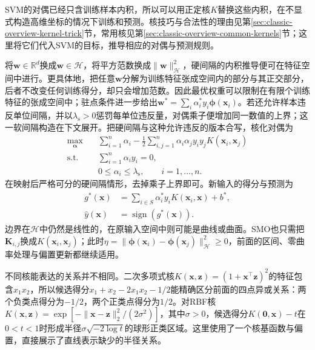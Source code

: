 SVM的对偶已经只含训练样本内积，所以可以用正定核$K$替换这些内积，在不显式构造高维坐标的情况下训练和预测。核技巧与合法性的理由见第\ref{sec:classic-overview-kernel-trick}节，常用核见第\ref{sec:classic-overview-common-kernels}节；这里将它们代入SVM的目标，推导相应的对偶与预测规则。

将$\bm{w}\in\mathbb{R}^d$换成$\bm{w}\in\mathcal{H}$，将平方范数换成$\lVert\bm{w}\rVert_{\mathcal{H}}^2$，硬间隔的内积推导便可在特征空间中进行。更具体地，把任意$\bm{w}$分解为训练特征张成空间内的部分与其正交部分，后者不改变任何训练得分，却只会增加范数。因此最优权重可以限制在有限个训练特征的张成空间中；驻点条件进一步给出$\bm{w}^{\ast}=\sum_i\alpha_i^{\ast}y_i\bm{\phi}(\bm{x}_i)$。若还允许样本违反单位间隔，并以$\lambda_{\mathrm s}>0$惩罚每单位违反量，对偶乘子便增加同一数值的上界；这一软间隔构造在下文展开。把硬间隔与这种允许违反的版本合写，核化对偶为
\begin{equation}
  \begin{aligned}
    \max_{\bm{\alpha}}\quad&
      \sum_{i=1}^n\alpha_i
       -\frac12\sum_{i,j=1}^n
          \alpha_i\alpha_j y_i y_j
          K(\bm{x}_i,\bm{x}_j)\\
    \text{s.t.}\quad&
      \sum_{i=1}^n\alpha_i y_i=0,\\
    &0\le\alpha_i\le\lambda_{\mathrm{s}},
      \qquad i=1,\ldots,n.
  \end{aligned}
  \label{eq:classification-svm-kernel-dual}
\end{equation}
在映射后严格可分的硬间隔情形，去掉乘子上界即可。新输入的得分与预测为
\begin{equation}
  \begin{aligned}
    g^{\ast}(\bm{x})
      &=\sum_{i\in S}\alpha_i^{\ast}y_i
         K(\bm{x}_i,\bm{x})+b^{\ast},\\
    \hat y(\bm{x})&=\operatorname{sign}(g^{\ast}(\bm{x})).
  \end{aligned}
  \label{eq:classification-svm-kernel-prediction}
\end{equation}
边界在$\mathcal{H}$中仍然是线性的，在原输入空间中则可能是曲线或曲面。SMO也只需把$\bm{K}_{i,j}$换成$K(\bm{x}_i,\bm{x}_j)$；此时$\eta=\lVert\bm{\phi}(\bm{x}_i)-\bm{\phi}(\bm{x}_j)\rVert_{\mathcal{H}}^2\ge0$，前面的区间、零曲率处理与偏置更新都继续适用。

不同核能表达的关系并不相同。二次多项式核$K(\bm x,\bm z)=(1+\bm x^\top\bm z)^2$的特征包含$x_1x_2$，所以候选得分$x_1+x_2-2x_1x_2-1/2$能精确区分前面的四点异或关系：两个负类点得分为$-1/2$，两个正类点得分为$1/2$。对RBF核$K(\bm x,\bm z)=\exp[-\|\bm x-\bm z\|_2^2/(2\sigma^2)]$，其中$\sigma>0$，候选得分$K(\bm0,\bm x)-t$在$0<t<1$时形成半径$\sigma\sqrt{-2\log t}$的球形正类区域。这里使用了一个核基函数与偏置，直接展示了直线表示缺少的半径关系。

